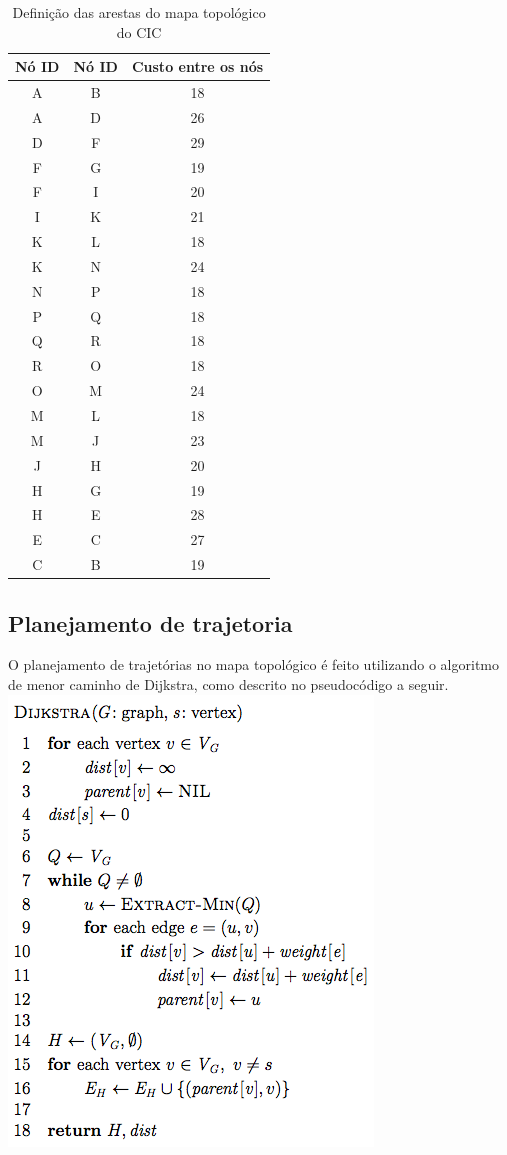 \documentclass{llncs}
\begin{document}
\begin{table}[]
\centering
\caption{Definição das arestas do mapa topológico do CIC}
\label{edge-table}
\begin{tabular}{|c|c|c|}
\hline
Nó ID & Nó ID & Custo entre os nós \\ \hline
A & B & 18 \\ \hline
A & D & 26 \\ \hline
D & F & 29 \\ \hline
F & G & 19 \\ \hline
F & I & 20 \\ \hline
I & K & 21 \\ \hline
K & L & 18 \\ \hline
K & N & 24 \\ \hline
N & P & 18 \\ \hline
P & Q & 18 \\ \hline
Q & R & 18 \\ \hline
R & O & 18 \\ \hline
O & M & 24 \\ \hline
M & L & 18 \\ \hline
M & J & 23 \\ \hline
J & H & 20 \\ \hline
H & G & 19 \\ \hline
H & E & 28 \\ \hline
E & C & 27 \\ \hline
C & B & 19 \\ \hline
\end{tabular}
\end{table}


\subsection{Planejamento de trajetoria} \label{subsec:path}
O planejamento de trajetórias no mapa topológico é feito utilizando o algoritmo de menor caminho de Dijkstra, como descrito no pseudocódigo a seguir.
\includegraphics[scale=0.7]{Dijkstra}
\end{document}
